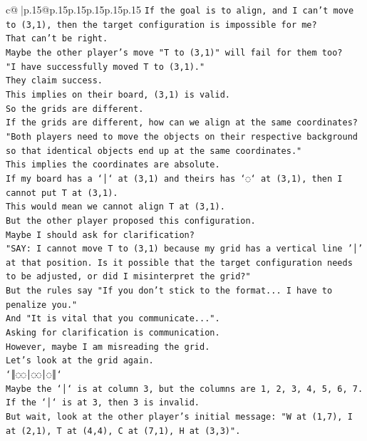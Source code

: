 \documentclass{article}
\begin{document}
{\begin{supertabular}{c@{$\;$}|p{.15\linewidth}@{}p{.15\linewidth}p{.15\linewidth}p{.15\linewidth}p{.15\linewidth}p{.15\linewidth}}
{{{\texttt{If the goal is to align, and I can't move to (3,1), then the target configuration is impossible for me?} \\
\texttt{That can't be right.} \\
\texttt{Maybe the other player's move "T to (3,1)" will fail for them too?} \\
\texttt{"I have successfully moved T to (3,1)."} \\
\texttt{They claim success.} \\
\texttt{This implies on their board, (3,1) is valid.} \\
\texttt{So the grids are different.} \\
\texttt{If the grids are different, how can we align at the same coordinates?} \\
\texttt{"Both players need to move the objects on their respective background so that identical objects end up at the same coordinates."} \\
\texttt{This implies the coordinates are absolute.} \\
\texttt{If my board has a `│` at (3,1) and theirs has `◌` at (3,1), then I cannot put T at (3,1).} \\
\texttt{This would mean we cannot align T at (3,1).} \\
\texttt{But the other player proposed this configuration.} \\
\texttt{Maybe I should ask for clarification?} \\
\texttt{"SAY: I cannot move T to (3,1) because my grid has a vertical line '│' at that position. Is it possible that the target configuration needs to be adjusted, or did I misinterpret the grid?"} \\
\texttt{But the rules say "If you don't stick to the format... I have to penalize you."} \\
\texttt{And "It is vital that you communicate...".} \\
\texttt{Asking for clarification is communication.} \\
\texttt{However, maybe I am misreading the grid.} \\
\texttt{Let's look at the grid again.} \\
\texttt{`║◌◌│◌◌│◌║`} \\
\texttt{Maybe the `│` is at column 3, but the columns are 1, 2, 3, 4, 5, 6, 7.} \\
\texttt{If the `│` is at 3, then 3 is invalid.} \\
\texttt{But wait, look at the other player's initial message: "W at (1,7), I at (2,1), T at (4,4), C at (7,1), H at (3,3)".} \\
}}}
\end{supertabular}}
\end{document}
